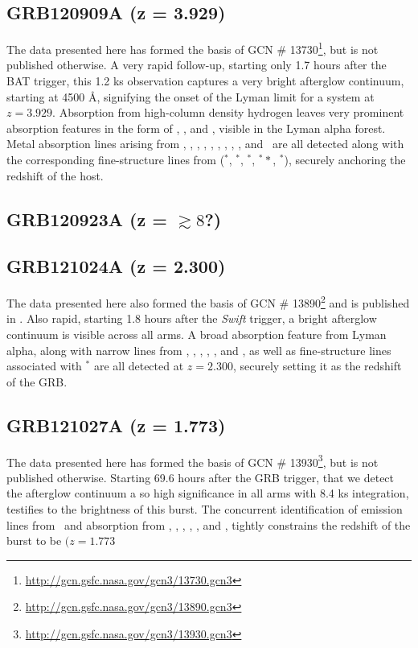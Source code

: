 \documentclass{aa}    %
\begin{document}
\subsection{GRB120909A (z = 3.929)}
The data presented here has formed the basis of GCN \#
13730\footnote{\url{http://gcn.gsfc.nasa.gov/gcn3/13730.gcn3}}, but is not
published otherwise. A very rapid follow-up, starting only 1.7 hours after the
BAT trigger, this 1.2 ks observation captures a very bright afterglow
continuum, starting at 4500 \AA, signifying the onset of the Lyman limit for a 
system at $z = 3.929$. Absorption from high-column density hydrogen leaves very
prominent absorption features in the form of \lya, \lyb, and \lyg, visible in
the Lyman alpha forest. Metal absorption lines arising from \feii, \NIii,
\SIii, \sii, \alii, \aliii, \cii, \oi, \civ, and \znii~are all detected along
with the corresponding fine-structure lines from (\feii$^*$, \SIii$^*$,
\oi$^*$, \oi$^**$, \cii$^*$), securely anchoring the redshift of the host.




\subsection{GRB120923A (z = $\gtrsim8$?)}






\subsection{GRB121024A (z = 2.300)}
The data presented here also formed the basis of GCN \#
13890\footnote{\url{http://gcn.gsfc.nasa.gov/gcn3/13890.gcn3}} and is published
in \citet{Friis2015}. Also rapid, starting 1.8 hours after the \textit{Swift}
trigger, a bright afterglow continuum is visible across all arms. A broad
absorption feature from Lyman alpha, along with narrow lines from \civ, \SIii,
\SIiv, \feii, \sii, and \alii, as well as fine-structure lines associated with
\SIii$^*$ are all detected at $z = 2.300$, securely setting it as the redshift
of the GRB.

\subsection{GRB121027A (z = 1.773)}		
The data presented here has formed the basis of GCN \#
13930\footnote{\url{http://gcn.gsfc.nasa.gov/gcn3/13930.gcn3}}, but is not
published otherwise. Starting 69.6 hours after the GRB trigger, that we detect
the afterglow continuum a so high significance in all arms with 8.4 ks
integration, testifies to the brightness of this burst. The concurrent
identification of emission lines from \oiii~and absorption from \civ, \alii,
\aliii, \mgi, \mgii, and \feii, tightly constrains the redshift of the burst to
be $(z = 1.773$
\end{document}
